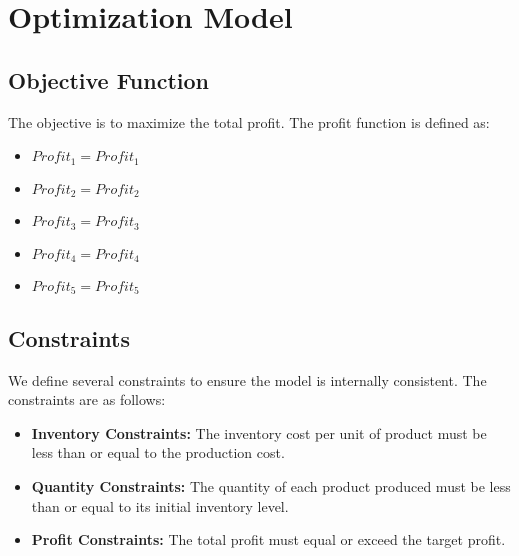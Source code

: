 \documentclass{article}
\begin{document}
\section{Optimization Model}

\subsection{Objective Function}
The objective is to maximize the total profit.  The profit function is defined as:

\begin{itemize}
    \item $Profit_1 = Profit_1$
    \item $Profit_2 = Profit_2$
    \item $Profit_3 = Profit_3$
    \item $Profit_4 = Profit_4$
    \item $Profit_5 = Profit_5$
\end{itemize}

\subsection{Constraints}

We define several constraints to ensure the model is internally consistent.  The constraints are as follows:

\begin{itemize}
    \item \textbf{Inventory Constraints:} The inventory cost per unit of product must be less than or equal to the production cost.
    \item \textbf{Quantity Constraints:}  The quantity of each product produced must be less than or equal to its initial inventory level.
    \item \textbf{Profit Constraints:} The total profit must equal or exceed the target profit.
\end{itemize}
\end{document}
